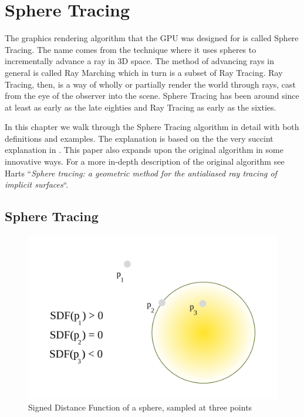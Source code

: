\chapter{Sphere Tracing}

	The graphics rendering algorithm that the GPU was designed for is called
	Sphere Tracing\cite{Hart1996}. The name comes from the technique where it
	uses spheres to incrementally advance a ray in 3D space. The method of
	advancing rays in general is called Ray Marching which in turn is a subset of
	Ray Tracing\cite{Whitted1980a}. Ray Tracing, then, is a way of wholly or
	partially render the world through rays, cast from the eye of the observer
	into the scene. Sphere Tracing has been around since at least as early as the
	late eighties\cite{Hart1989} and Ray Tracing as early as the
	sixties\cite{Appel1968}.

	In this chapter we walk through the Sphere Tracing algorithm in detail with
	both definitions and examples. The explanation is based on the the very
	succint explanation in \cite{Korndorfer2014}. This paper also expands upon
	the original algorithm in some innovative ways. For a more in-depth
	description of the original algorithm see Harts ``\emph{Sphere tracing: a
	geometric method for the antialiased ray tracing of implicit
	surfaces}``\cite{Hart1996}.

	\section{Sphere Tracing} 

		\begin{figure}
			\begin{flushright}
				\includegraphics[width=0.9\linewidth]{figure/SDF} 
			\end{flushright}
			\caption{ Signed Distance Function of a sphere, sampled at three points}
			\vspace{40pt}
		\end{figure}

